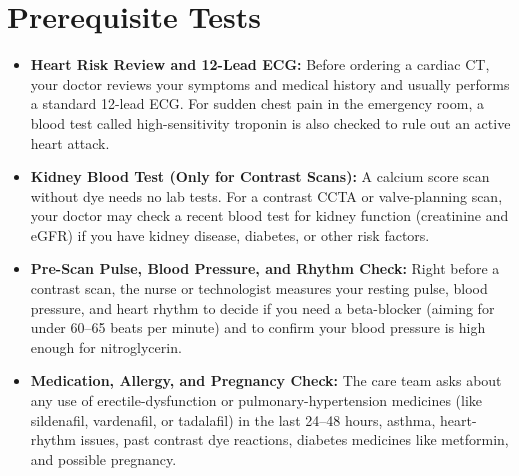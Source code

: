 \section{Prerequisite Tests}
\begin{itemize}
    \item \textbf{Heart Risk Review and 12-Lead ECG:} Before ordering a cardiac CT, your doctor reviews your symptoms and medical history and usually performs a standard 12-lead ECG. For sudden chest pain in the emergency room, a blood test called high-sensitivity troponin is also checked to rule out an active heart attack.
    \item \textbf{Kidney Blood Test (Only for Contrast Scans):} A calcium score scan without dye needs no lab tests. For a contrast CCTA or valve-planning scan, your doctor may check a recent blood test for kidney function (creatinine and eGFR) if you have kidney disease, diabetes, or other risk factors.
    \item \textbf{Pre-Scan Pulse, Blood Pressure, and Rhythm Check:} Right before a contrast scan, the nurse or technologist measures your resting pulse, blood pressure, and heart rhythm to decide if you need a beta-blocker (aiming for under 60--65 beats per minute) and to confirm your blood pressure is high enough for nitroglycerin.
    \item \textbf{Medication, Allergy, and Pregnancy Check:} The care team asks about any use of erectile-dysfunction or pulmonary-hypertension medicines (like sildenafil, vardenafil, or tadalafil) in the last 24--48 hours, asthma, heart-rhythm issues, past contrast dye reactions, diabetes medicines like metformin, and possible pregnancy.
\end{itemize}

